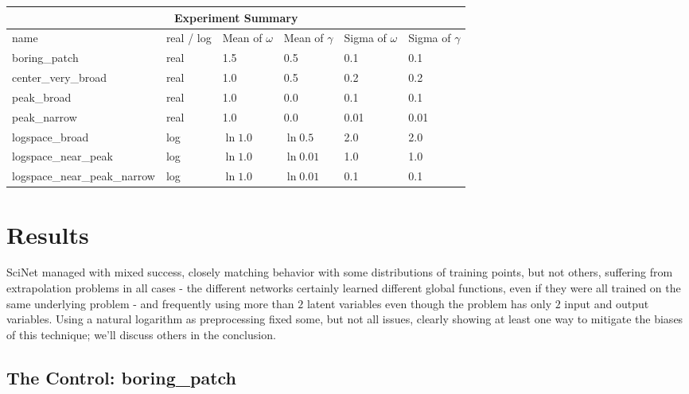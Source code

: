 \documentclass[aps,prl,preprint,groupedaddress]{revtex4-1}
\begin{document}
%
\begin{tabular}{ |p{5cm}||p{2cm}|p{2cm}|p{2cm}|p{2cm}|p{2cm}|  }
 \hline
 \multicolumn{6}{|c|}{Experiment Summary} \\
 \hline
 name& real / log & Mean of $\omega$&Mean of $\gamma$&Sigma of $\omega$&Sigma of $\gamma$\\
 \hline
 boring\_patch   & real &1.5&0.5&0.1&0.1\\
 center\_very\_broad   & real &1.0&0.5&0.2&0.2\\
 peak\_broad   & real &1.0&0.0&0.1&0.1\\
 peak\_narrow   & real &1.0&0.0&0.01&0.01\\
 logspace\_broad   & log &$\ln 1.0$&$\ln 0.5$&2.0&2.0\\
 logspace\_near\_peak   & log &$\ln 1.0$&$\ln 0.01$&1.0&1.0\\
 logspace\_near\_peak\_narrow   & log &$\ln 1.0$&$\ln 0.01$&0.1&0.1\\
 \hline
\end{tabular}

\section{Results}

SciNet managed with mixed success, closely matching behavior with some distributions of training points, but not others, suffering from extrapolation problems in all cases - the different networks certainly learned different global functions, even if they were all trained on the same underlying problem - and frequently using more than $2$ latent variables even though the problem has only $2$ input and output variables. Using a natural logarithm as preprocessing fixed some, but not all issues, clearly showing at least one way to mitigate the biases of this technique; we'll discuss others in the conclusion.

\subsection{ The Control: boring\_patch}
\end{document}
